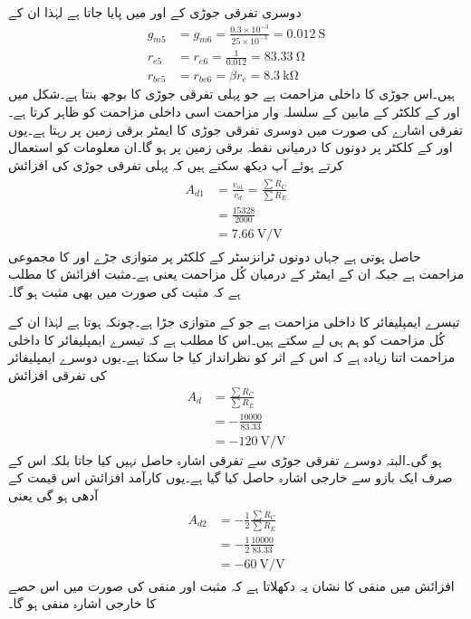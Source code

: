 دوسری تفرقی جوڑی کے  اور  میں  پایا جاتا ہے لہٰذا ان کے
\begin{align*}
g_{m5}&=g_{m6}=\frac{0.3 \times 10^{-3}}{25 \times 10^{-3}}=\SI{0.012}{\siemens}\\
r_{e5}&=r_{e6}=\frac{1}{0.012}=\SI{83.33}{\ohm}\\
r_{be5}&=r_{be6}=\beta r_e =\SI{8.3}{\kilo \ohm}
\end{align*}
ہیں۔اس جوڑی کا داخلی مزاحمت  ہے جو پہلی تفرقی جوڑی کا بوجھ بنتا ہے۔شکل میں  اور  کے کلکٹر کے مابین  کے سلسلہ وار مزاحمت اسی داخلی مزاحمت کو ظاہر کرتا ہے۔تفرقی اشارے کی صورت میں دوسری تفرقی جوڑی کا ایمٹر برقی زمین پر رہتا ہے۔یوں  اور  کے کلکٹر پر دونوں   کا درمیانی نقطہ برقی زمین پر ہو گا۔ان معلومات کو استعمال کرتے ہوئے آپ دیکھ سکتے ہیں کہ پہلی تفرقی جوڑی کی افزائش
\begin{gather}
\begin{aligned}\label{مساوات_تفرقی_پہلی_کڑی_کی_افزائش}
A_{d1}&=\frac{v_{o1}}{v_d}=\frac{\sum R_C}{\sum R_E}\\
&=\frac{15328}{2000}\\
&=\SI{7.66}{\volt \per \volt}
\end{aligned}
\end{gather} 
حاصل ہوتی ہے جہاں  دونوں ٹرانزسٹر کے کلکٹر پر متوازی جڑے  اور  کا مجموعی مزاحمت ہے جبکہ  ان کے ایمٹر کے درمیان کُل مزاحمت یعنی  ہے۔مثبت افزائش کا مطلب ہے کہ مثبت  کی صورت میں  بھی مثبت ہو گا۔

تیسرے ایمپلیفائر کا داخلی مزاحمت  ہے جو  کے متوازی جڑا ہے۔چونکہ
  ہوتا ہے لہٰذا ان کے کُل مزاحمت کو ہم  ہی لے سکتے ہیں۔اس کا مطلب ہے کہ تیسرے ایمپلیفائر کا داخلی مزاحمت اتنا زیادہ ہے کہ اس کے اثر کو نظرانداز کیا جا سکتا ہے۔یوں دوسرے ایمپلیفائر کی تفرقی افزائش
\begin{align*}
A_{d}&=\frac{\sum R_C}{\sum R_E}\\
&=-\frac{10000}{83.33}\\
&=\SI{-120}{\volt \per \volt}
\end{align*}
ہو گی۔البتہ دوسرے تفرقی جوڑی سے تفرقی اشارہ حاصل نہیں کیا جاتا بلکہ اس کے صرف ایک بازو سے خارجی اشارہ حاصل کیا گیا ہے۔یوں کارآمد افزائش اس قیمت کے آدھی ہو گی یعنی
\begin{gather}
\begin{aligned}\label{مساوات_تفرقی_دوسری_کڑی_کی_افزائش}
A_{d2}&=-\frac{1}{2} \frac{\sum R_C}{\sum R_E}\\
&=-\frac{1}{2}\frac{10000}{83.33}\\
&=\SI{-60}{\volt \per \volt}
\end{aligned}
\end{gather}
افزائش میں منفی کا نشان  یہ دکھلاتا ہے کہ مثبت  اور منفی  کی صورت میں اس حصے کا خارجی اشارہ منفی ہو گا۔

